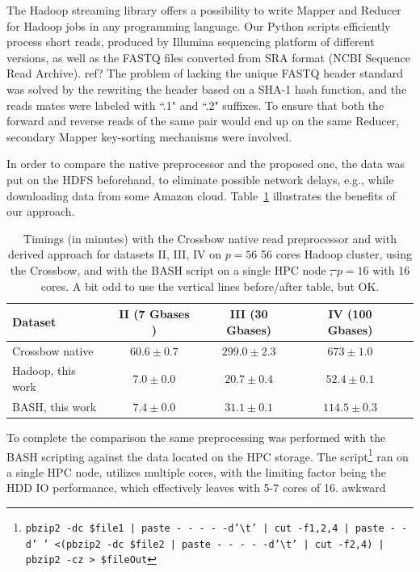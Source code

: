 \documentclass[11pt, oneside]{article}   	%
\newcommand{\COMMENT}[1]{{\color{red} #1 }}
\begin{document}
The Hadoop streaming library offers a possibility to write Mapper and Reducer for Hadoop jobs in any programming language. Our Python scripts efficiently process short reads, produced by Illumina sequencing platform of different versions, as well as the FASTQ files converted from SRA format (NCBI Sequence Read Archive).\COMMENT{ref?} 
The problem of lacking the unique FASTQ header standard was solved by the rewriting the header based on a SHA-1 hash function, and the reads mates were labeled with ``.1" and ``.2" suffixes. 
To ensure that both the forward and reverse reads of the same pair would end up on the same Reducer, secondary Mapper key-sorting mechanisms were involved.

In order to compare the native preprocessor and the proposed one, the data was put on the HDFS beforehand, to eliminate possible network delays, e.g., while downloading data from some Amazon cloud.
Table~\ref{table:preprocess} illustrates the benefits of our approach.
\begin{table}[htdp]
\small
\caption{Timings (in minutes) with the  Crossbow native read preprocessor and with derived approach for  datasets II, III, IV  on \sout{$p=56$} 56 cores Hadoop cluster, using the Crossbow, and with the BASH script on a single HPC node \sout{, $p=16$} with 16 cores. \COMMENT{A bit odd to use the vertical lines before/after table, but OK.}}
\begin{center}
\begin{tabular}{|l|c|c|c|c|}
Dataset			&		II (7 Gbases )	& III (30 Gbases)	& IV (100 Gbases)\\
\hline
Crossbow native			&		$60.6\pm0.7$	& $299.0\pm2.3$	&	$673\pm1.0$	\\
Hadoop, this work			&		$7.0\pm0.0$	&	$20.7\pm0.4$&		$52.4\pm0.1$\\
BASH, this work			& 		$7.4\pm0.0$	&	$31.1\pm0.1$	&	$114.5\pm0.3$	\\
\end{tabular}
\end{center}
\label{table:preprocess}
\normalsize
\end{table}%
To complete the comparison the same preprocessing was performed with the BASH scripting against the data located on the HPC storage. The script\footnote{\texttt {pbzip2 -dc  \${file1} | paste - - - - -d'\textbackslash t' | cut -f1,2,4 | paste - -d' ' <(pbzip2 -dc  \${file2} | paste - - - - -d'\textbackslash t' | cut -f2,4) | pbzip2 -cz > \${fileOut}}} ran on a single HPC node, utilizes multiple cores, with the limiting factor being the HDD IO performance, which effectively leaves with 5-7 cores of 16. \COMMENT{awkward}
\end{document}
